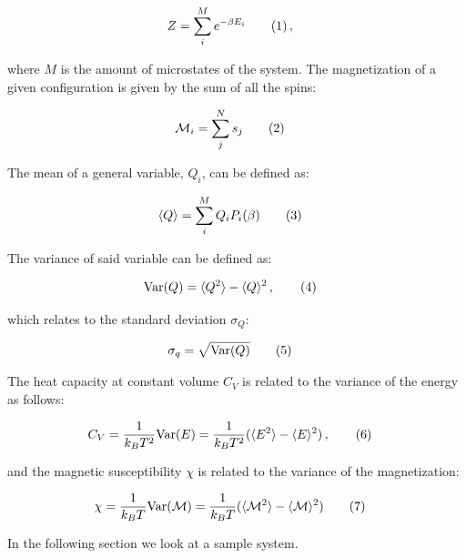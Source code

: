 \documentclass[reprint,english,notitlepage]{revtex4-1}  %
\newcommand\numberthis{\addtocounter{equation}{1}\tag{\theequation}}
\begin{document}
\begin{align*}
Z &= \sum\limits_i^M e^{-\beta E_i} \numberthis \label{eq:ising_partition_function} \, ,
\end{align*}  

where $M$ is the amount of microstates of the system. The magnetization of a given configuration is given by the sum of all the spins:

\begin{align*}
\mathcal{M}_i &= \sum\limits_j^N s_j \numberthis \label{eq:ising_magnetization}
\end{align*}

The mean of a general variable, $Q_i$, can be defined as:

\begin{align*}
\langle Q \rangle &= \sum\limits_i^M Q_i P_i(\beta) \numberthis \label{eq:mean}
\end{align*}

The variance of said variable can be defined as:

\begin{align*}
\text{Var}(Q) &= \langle Q^2 \rangle - \langle Q \rangle^2 \, , \numberthis \label{eq:variance} 
\end{align*}

which relates to the standard deviation $\sigma_Q$:

\begin{align*}
\sigma_q &= \sqrt{\text{Var}(Q)} \numberthis \label{eq:standard_deviation}
\end{align*}

The heat capacity at constant volume $C_V$ is related to the variance of the energy as follows:

\begin{align*}
C_V &= \frac{1}{k_B T^2} \text{Var}(E) = \frac{1}{k_B T^2} (\langle E^2 \rangle - \langle E \rangle^2) \, ,\numberthis \label{eq:heat_capacity}
\end{align*}

and the magnetic susceptibility $\chi$ is related to the variance of the magnetization:

\begin{align*}
\chi &= \frac{1}{k_B T} \text{Var}(\mathcal{M}) = \frac{1}{k_B T} ( \langle \mathcal{M}^2 \rangle - \langle \mathcal{M} \rangle^2) \numberthis \label{eq:magnetic_susceptibility}
\end{align*}

In the following section we look at a sample system.
\end{document}
